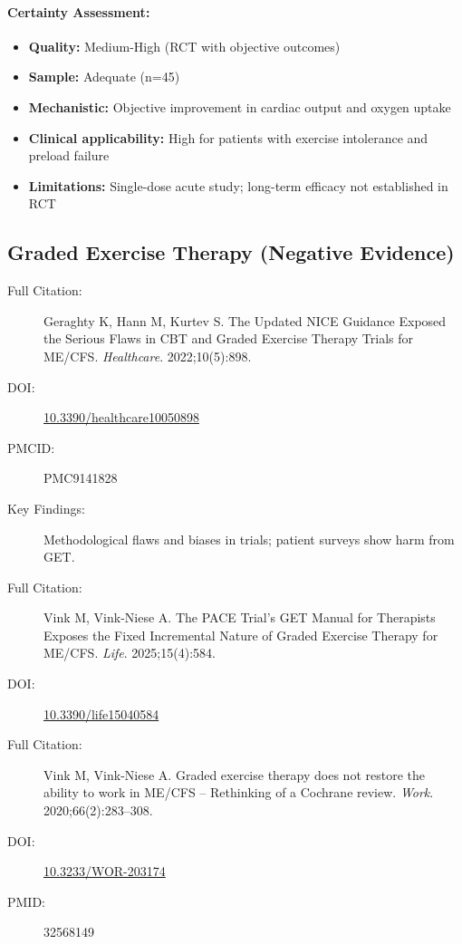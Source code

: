 \paragraph{Certainty Assessment:}
\begin{itemize}
    \item \textbf{Quality:} Medium-High (RCT with objective outcomes)
    \item \textbf{Sample:} Adequate (n=45)
    \item \textbf{Mechanistic:} Objective improvement in cardiac output and oxygen uptake
    \item \textbf{Clinical applicability:} High for patients with exercise intolerance and preload failure
    \item \textbf{Limitations:} Single-dose acute study; long-term efficacy not established in RCT
\end{itemize}

\subsection{Graded Exercise Therapy (Negative Evidence)}

\begin{description}
    \item[Full Citation:] Geraghty K, Hann M, Kurtev S. The Updated NICE Guidance Exposed the Serious Flaws in CBT and Graded Exercise Therapy Trials for ME/CFS. \textit{Healthcare}. 2022;10(5):898.
    \item[DOI:] \href{https://doi.org/10.3390/healthcare10050898}{10.3390/healthcare10050898}
    \item[PMCID:] PMC9141828
    \item[Key Findings:] Methodological flaws and biases in trials; patient surveys show harm from GET.
\end{description}

\begin{description}
    \item[Full Citation:] Vink M, Vink-Niese A. The PACE Trial's GET Manual for Therapists Exposes the Fixed Incremental Nature of Graded Exercise Therapy for ME/CFS. \textit{Life}. 2025;15(4):584.
    \item[DOI:] \href{https://doi.org/10.3390/life15040584}{10.3390/life15040584}
\end{description}

\begin{description}
    \item[Full Citation:] Vink M, Vink-Niese A. Graded exercise therapy does not restore the ability to work in ME/CFS -- Rethinking of a Cochrane review. \textit{Work}. 2020;66(2):283--308.
    \item[DOI:] \href{https://doi.org/10.3233/WOR-203174}{10.3233/WOR-203174}
    \item[PMID:] 32568149
\end{description}

